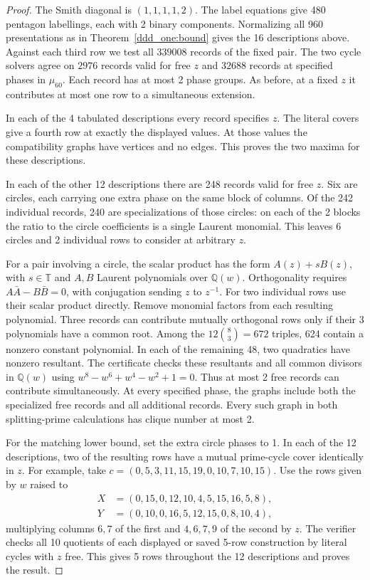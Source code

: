 \documentclass[11pt,a4paper]{article}
\theoremstyle{plain}
\theoremstyle{definition}
\theoremstyle{plain}
\begin{document}
\begin{proof}
The Smith diagonal is $(1,1,1,1,2)$. The label equations give 480 pentagon labellings, each with 2 binary components. Normalizing all 960 presentations as in Theorem~\ref{ddd_one:bound} gives the 16 descriptions above. Against each third row we test all $339008$ records of the fixed pair. The two cycle solvers agree on $2976$ records valid for free $z$ and $32688$ records at specified phases in $\mu_{60}$. Each record has at most 2 phase groups. As before, at a fixed $z$ it contributes at most one row to a simultaneous extension.

In each of the 4 tabulated descriptions every record specifies $z$. The literal covers give a fourth row at exactly the displayed values. At those values the compatibility graphs have vertices and no edges. This proves the two maxima for these descriptions.

In each of the other 12 descriptions there are 248 records valid for free $z$. Six are circles, each carrying one extra phase on the same block of columns. Of the 242 individual records, 240 are specializations of those circles: on each of the 2 blocks the ratio to the circle coefficients is a single Laurent monomial. This leaves 6 circles and 2 individual rows to consider at arbitrary $z$.

For a pair involving a circle, the scalar product has the form $A(z)+sB(z)$, with $s\in\mathbb T$ and $A,B$ Laurent polynomials over $\mathbb Q(w)$. Orthogonality requires $A\bar A-B\bar B=0$, with conjugation sending $z$ to $z^{-1}$. For two individual rows use their scalar product directly. Remove monomial factors from each resulting polynomial. Three records can contribute mutually orthogonal rows only if their 3 polynomials have a common root. Among the $12\binom83=672$ triples, 624 contain a nonzero constant polynomial. In each of the remaining 48, two quadratics have nonzero resultant. The certificate checks these resultants and all common divisors in $\mathbb Q(w)$ using $w^8-w^6+w^4-w^2+1=0$. Thus at most 2 free records can contribute simultaneously. At every specified phase, the graphs include both the specialized free records and all additional records. Every such graph in both splitting-prime calculations has clique number at most 2.

For the matching lower bound, set the extra circle phases to 1. In each of the 12 descriptions, two of the resulting rows have a mutual prime-cycle cover identically in $z$. For example, take $c=(0,5,3,11,15,19,0,10,7,10,15)$. Use the rows given by $w$ raised to
$$\begin{aligned}
X&=(0,15,0,12,10,4,5,15,16,5,8),\\
Y&=(0,10,0,16,5,12,15,0,8,10,4),
\end{aligned}$$
multiplying columns $6,7$ of the first and $4,6,7,9$ of the second by $z$. The verifier checks all 10 quotients of each displayed or saved 5-row construction by literal cycles with $z$ free. This gives 5 rows throughout the 12 descriptions and proves the result.
\end{proof}
\end{document}
